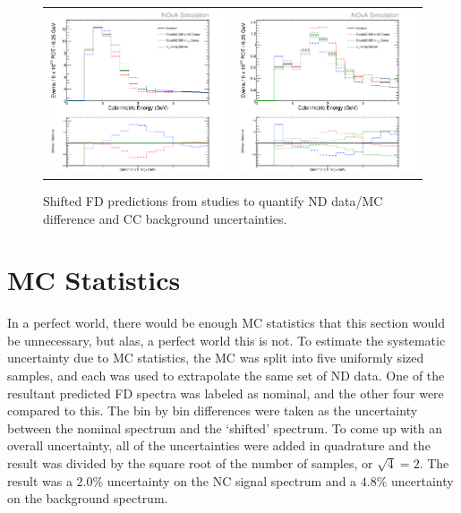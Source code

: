 \begin{figure}[htb]
  \centering
  \begin{tabular}{c c}
    \includegraphics[width=.47\textwidth]{figures/Systs/cNCEXDecompSysts.png} &
    \includegraphics[width=.47\linewidth]{figures/Systs/cBGEXDecompSysts.png} \\
  \end{tabular}
  \caption[Systematic Uncertainty Due to ND Data/MC Discrepancy and CC Background Uncertainty]{Shifted FD predictions from studies to quantify ND data/MC difference and CC background uncertainties.}
  \label{fig:SystNDDataMC}
\end{figure}

\section{MC Statistics}
\label{sec:SystMCStats}

In a perfect world, there would be enough MC statistics that this section would be unnecessary, but alas, a perfect world this is not. To estimate the systematic uncertainty due to MC statistics, the MC was split into five uniformly sized samples, and each was used to extrapolate the same set of ND data. One of the resultant predicted FD spectra was labeled as nominal, and the other four were compared to this. The bin by bin differences were taken as the uncertainty between the nominal spectrum and the `shifted' spectrum. To come up with an overall uncertainty, all of the uncertainties were added in quadrature and the result was divided by the square root of the number of samples, or $\sqrt{4} = 2$. The result was a $2.0\%$ uncertainty on the NC signal spectrum and a $4.8\%$ uncertainty on the background spectrum.

